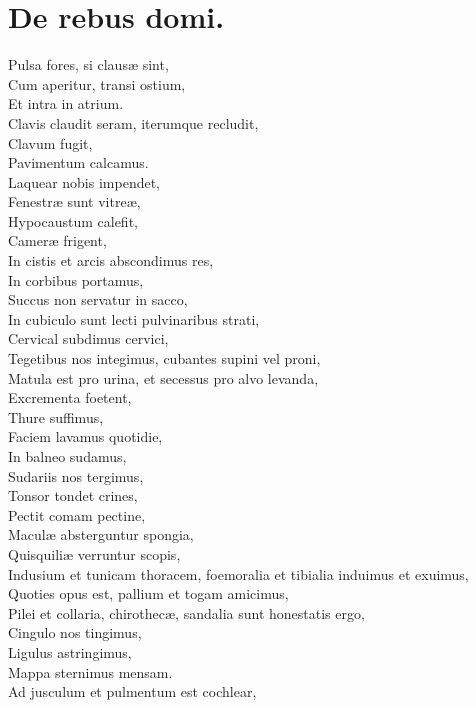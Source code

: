 \documentclass[12pt, twocolumn]{memoir}
\begin{document}
\chapter{De rebus domi.}

Pulsa fores, si clausæ sint,\\
Cum aperitur, transi ostium,\\
Et intra in atrium.\\
Clavis claudit seram, iterumque recludit,\\
Clavum fugit,\\
Pavimentum calcamus. \\
Laquear nobis impendet,\\
Fenestræ sunt vitreæ,\\
Hypocaustum calefit,\\
Cameræ frigent,\\
In cistis et arcis abscondimus res,\\
In corbibus portamus,\\
Succus non servatur in sacco,\\
In cubiculo sunt lecti pulvinaribus strati, \\
Cervical subdimus cervici,\\
Tegetibus nos integimus, cubantes supini vel proni,\\
Matula est pro urina, et secessus pro alvo levanda,\\
Excrementa foetent,\\
Thure suffimus,\\
Faciem lavamus quotidie,\\
In balneo sudamus,\\
Sudariis nos tergimus,\\
Tonsor tondet crines,\\
Pectit comam pectine,\\
Maculæ absterguntur spongia,\\
Quisquiliæ verruntur scopis,\\
Indusium et tunicam thoracem, foemoralia et tibialia induimus et exuimus,\\
Quoties opus est, pallium et togam amicimus,\\
Pilei et collaria, chirothecæ, sandalia sunt honestatis ergo,\\
Cingulo nos tingimus,\\
Ligulus astringimus,\\
Mappa sternimus mensam.\\
Ad jusculum et pulmentum est cochlear,\\
\end{document}
